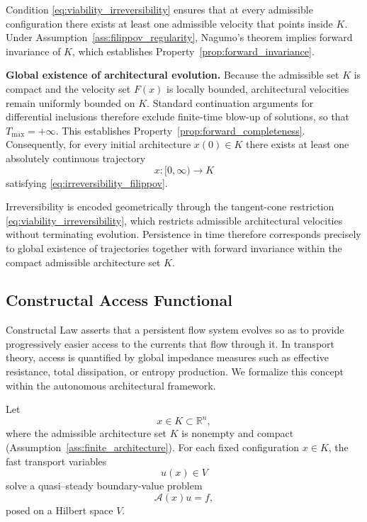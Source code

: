 \documentclass[12pt]{article}
\theoremstyle{plain}
\theoremstyle{definition}
\theoremstyle{remark}
\begin{document}
Condition \eqref{eq:viability_irreversibility}
ensures that at every admissible configuration there exists at least
one admissible velocity that points inside $K$.
Under Assumption~\ref{ass:filippov_regularity},
Nagumo’s theorem implies forward invariance of $K$,
which establishes Property~\ref{prop:forward_invariance}.

\medskip

\noindent
\textbf{Global existence of architectural evolution.} Because the admissible set $K$ is compact and the velocity set
$F(x)$ is locally bounded,
architectural velocities remain uniformly bounded on $K$.
Standard continuation arguments for differential inclusions therefore
exclude finite-time blow-up of solutions,
so that $T_{\max}=+\infty$.
This establishes Property~\ref{prop:forward_completeness}. Consequently, for every initial architecture $x(0)\in K$
there exists at least one absolutely continuous trajectory
\[
x:[0,\infty)\to K
\]
satisfying \eqref{eq:irreversibility_filippov}.

Irreversibility is encoded geometrically through the tangent-cone
restriction \eqref{eq:viability_irreversibility},
which restricts admissible architectural velocities without
terminating evolution.
Persistence in time therefore corresponds precisely to global
existence of trajectories together with forward invariance within the
compact admissible architecture set $K$.



\subsection{Constructal Access Functional}
\label{subsec:access_functional}

Constructal Law asserts that a persistent flow system evolves so as to
provide progressively easier access to the currents that flow through it.
In transport theory, access is quantified by global impedance measures
such as effective resistance, total dissipation, or entropy production.
We formalize this concept within the autonomous architectural framework.

Let
\begin{equation}
x \in K \subset \mathbb{R}^n,
\label{eq:architectural_state}
\end{equation}
where the admissible architecture set $K$ is nonempty and compact
(Assumption~\ref{ass:finite_architecture}).
For each fixed configuration $x\in K$, the fast transport variables
\begin{equation}
u(x) \in V
\label{eq:transport_solution}
\end{equation}
solve a quasi–steady boundary-value problem
\begin{equation}
\mathcal A(x)u = f,
\label{eq:transport_operator}
\end{equation}
posed on a Hilbert space $V$.
\end{document}
